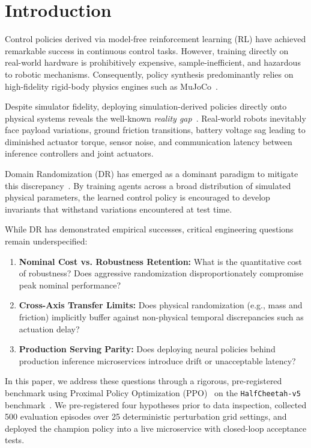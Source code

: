 \documentclass[conference]{IEEEtran}
\begin{document}
\section{Introduction}
Control policies derived via model-free reinforcement learning (RL) have achieved remarkable success in continuous control tasks. However, training directly on real-world hardware is prohibitively expensive, sample-inefficient, and hazardous to robotic mechanisms. Consequently, policy synthesis predominantly relies on high-fidelity rigid-body physics engines such as MuJoCo~\cite{todorov2012mujoco}.

Despite simulator fidelity, deploying simulation-derived policies directly onto physical systems reveals the well-known \emph{reality gap}~\cite{tobin2017domain, peng2018sim}. Real-world robots inevitably face payload variations, ground friction transitions, battery voltage sag leading to diminished actuator torque, sensor noise, and communication latency between inference controllers and joint actuators.

Domain Randomization (DR) has emerged as a dominant paradigm to mitigate this discrepancy~\cite{tobin2017domain, peng2018sim, tan2018sim, andrychowicz2020learning}. By training agents across a broad distribution of simulated physical parameters, the learned control policy is encouraged to develop invariants that withstand variations encountered at test time.

While DR has demonstrated empirical successes, critical engineering questions remain underspecified:
\begin{enumerate}
    \item \textbf{Nominal Cost vs. Robustness Retention:} What is the quantitative cost of robustness? Does aggressive randomization disproportionately compromise peak nominal performance?
    \item \textbf{Cross-Axis Transfer Limits:} Does physical randomization (e.g., mass and friction) implicitly buffer against non-physical temporal discrepancies such as actuation delay?
    \item \textbf{Production Serving Parity:} Does deploying neural policies behind production inference microservices introduce drift or unacceptable latency?
\end{enumerate}

In this paper, we address these questions through a rigorous, pre-registered benchmark using Proximal Policy Optimization (PPO)~\cite{schulman2017proximal} on the \texttt{HalfCheetah-v5} benchmark~\cite{towers2023gymnasium}. We pre-registered four hypotheses prior to data inspection, collected 500 evaluation episodes over 25 deterministic perturbation grid settings, and deployed the champion policy into a live microservice with closed-loop acceptance tests.
\end{document}
